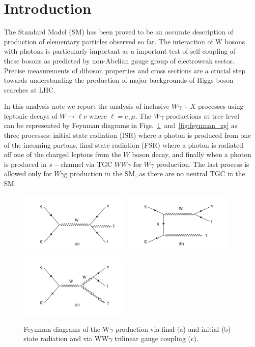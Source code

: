 \section{Introduction}
\label{sec:intro}
The Standard Model (SM) has been proved to be an accurate description 
of production of elementary particles observed so far. The interaction of W bosons
with photons is particularly important as a important test of self coupling 
of these bosons as predicted by non-Abelian gauge group of electroweak sector. Precise measurements of diboson properties and cross 
sections are a crucial step towards understanding the production of major 
backgrounds of Higgs boson searches at LHC. 

In this analysis note we report the analysis of inclusive $W\gamma + X$  processes  
using  leptonic decays of $W\to \ell\nu$ where $\ell = e, \mu$. 
The $W\gamma$ productions at tree level can be represented by Feynman diagrams in 
Figs.~\ref{fig:feynman_wg}~and~\ref{fig:feynman_zg} 
as three processes: initial state radiation (ISR) where a photon is produced from one of 
the incoming partons, final state radiation (FSR) where a photon is radiated off one of 
the charged leptons from the $W$ boson decay, and finally when a photon is produced in 
$s-$channel via TGC $WW\gamma$ for $W\gamma$ production.  The last process is allowed only for $W\gamma$g production in the SM, as there are no neutral TGC in the SM.
\begin{figure}[htb]
\begin{center}
{\includegraphics[width=0.49\textwidth]{figs/wg_fsr}}
{\includegraphics[width=0.49\textwidth]{figs/wg_isr}}
{\includegraphics[width=0.49\textwidth]{figs/wg_wwg}}
\caption{Feynman diagrams of the W$\gamma$ production via 
final (a) and initial (b) state radiation and via WW$\gamma$ 
trilinear gauge coupling (c).}
\label{fig:feynman_wg}
\end{center}
\end{figure}

